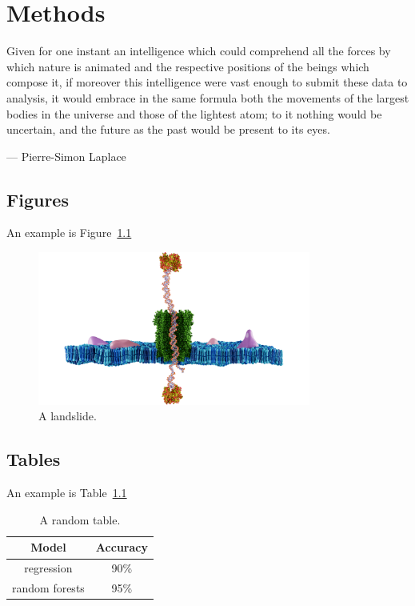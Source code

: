 \chapter{Methods}

\epigraph{Given for one instant an intelligence which could comprehend all
the forces by which nature is animated and the respective positions
of the beings which compose it, if moreover this intelligence were vast
enough to submit these data to analysis, it would embrace in the same
formula both the movements of the largest bodies in the universe and
those of the lightest atom; to it nothing would be uncertain, and the
future as the past would be present to its eyes.}
{--- \textup{Pierre-Simon Laplace}}

\section{Figures}
An example is Figure~\ref{Landslide}
\begin{figure}[h] %
    \centering %
    \includegraphics[width=0.8\textwidth]{Figures/CoverPhoto.png}
    \caption{A landslide.}
    \label{Landslide}
\end{figure}

\newpage

\section{Tables}
An example is Table~\ref{Tabel1}
\begin{table}[h]
    \centering
    \begin{tabular}{|c|c|}
        \hline
       Model  &  Accuracy  \\ \hline
        regression & 90\%                \\ \hline
        random forests & 95\%           \\ \hline
    \end{tabular}
    \caption{A random table.}
    \label{Tabel1}
\end{table}

